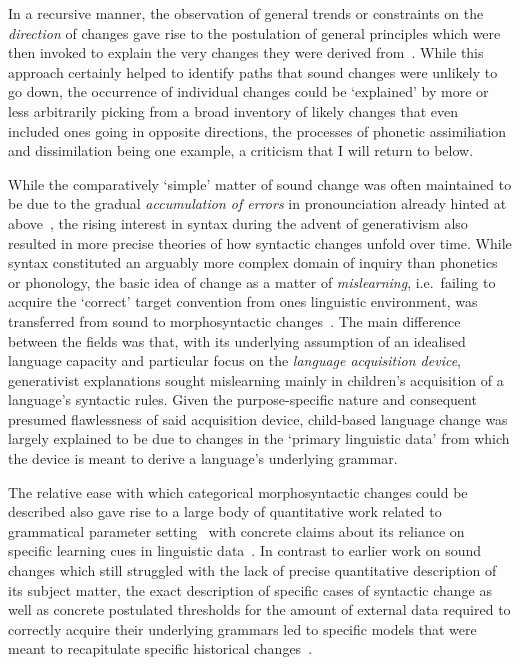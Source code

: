 In a recursive manner, the observation of general trends or constraints on the \emph{direction} of changes gave rise to the postulation of general principles which were then invoked to explain the very changes they were derived from~\citep{Lass1980,Haspelmath2006}. While this approach certainly helped to identify paths that sound changes were unlikely %
to go down, the occurrence of individual changes could be `explained' by more or less arbitrarily picking from a broad inventory of likely changes that even included ones going in opposite directions, the processes of phonetic assimiliation and dissimilation being one example, a criticism that I will return to below.


While the comparatively `simple' matter of sound change was often maintained to be due to the gradual \emph{accumulation of errors} in pronounciation already hinted at above~\citep[see e.g.][for a textbook account of the general principle]{Jespersen1949}, the rising interest in syntax during the advent of generativism also resulted in more precise theories of how syntactic changes unfold over time. While syntax constituted an arguably more complex domain of inquiry than phonetics or phonology, the basic idea of change as a matter of \emph{mislearning}, i.e.~failing to acquire the `correct' target convention from ones linguistic environment, was transferred from sound to morphosyntactic changes~\citep{Salmons2013}.
The main difference between the fields was that, with its underlying assumption of an idealised language capacity and particular focus on the \emph{language acquisition device}, generativist explanations sought mislearning mainly in children's acquisition of a language's syntactic rules. Given the purpose-specific nature and consequent presumed flawlessness of said acquisition device, child-based language change was largely explained to be due to changes in the `primary linguistic data' from which the device is meant to derive a language's underlying grammar.

The relative ease with which categorical morphosyntactic changes could be described also gave rise to a large body of quantitative work related to grammatical parameter setting~\citep{Lightfoot1991} with concrete claims about its reliance on specific learning cues in linguistic data~\citep{Gibson1994}.
In contrast to earlier work on sound changes which still struggled with the lack of precise quantitative description of its subject matter, the exact description of specific cases of syntactic change as well as concrete postulated thresholds for the amount of external data required to correctly acquire their underlying grammars led to specific models that were meant to recapitulate specific historical changes~\citet[e.g.]{Yang2002}. %

